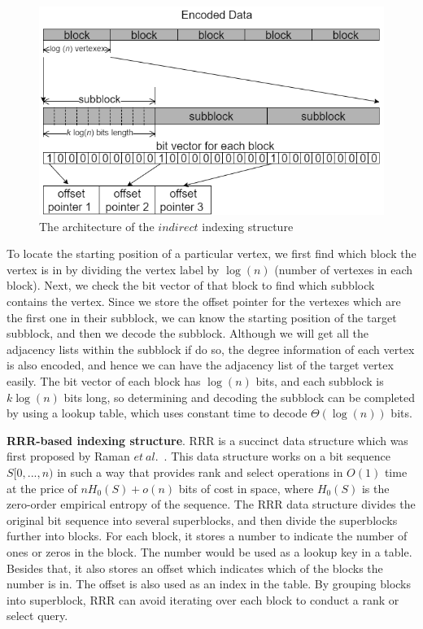 \documentclass[12pt,glossary]{dalthesis}
\begin{document}
\bigskip

\begin{figure}[ht]
\centering
\includegraphics[width=1.0\textwidth]{indirect}
\caption{The architecture of the $indirect$ indexing structure}
\end{figure}

\bigskip

To locate the starting position of a particular vertex, we first find which block the vertex is in by dividing the vertex label by $\log(n)$ (number of vertexes in each block). Next, we check the bit vector of that block to find which subblock contains the vertex. Since we store the offset pointer for the vertexes which are the first one in their subblock, we can know the starting position of the target subblock, and then we decode the subblock. Although we will get all the adjacency lists within the subblock if do so, the degree information of each vertex is also encoded, and hence we can have the adjacency list of the target vertex easily. The bit vector of each block has $\log(n)$ bits, and each subblock is $k\log(n)$ bits long, so determining and decoding the subblock can be completed by using a lookup table, which uses constant time to decode $\Theta(\log(n))$ bits.              

\bigskip
\bigskip

\textbf{RRR-based indexing structure}. RRR is a succinct data structure which was first proposed by Raman $et \ al$.~\cite{RRR}. This data structure works on a bit sequence $S[0,...,n)$ in such a way that provides rank and select operations in $O(1)$ time at the price of $nH_{0}(S)+o(n)$ bits of cost in space, where $H_{0}(S)$ is the zero-order empirical entropy of the sequence. The RRR data structure divides the original bit sequence into several superblocks, and then divide the superblocks further into blocks. For each block, it stores a number to indicate the number of ones or zeros in the block. The number would be used as a lookup key in a table. Besides that, it also stores an offset which indicates which of the blocks the number is in. The offset is also used as an index in the table. By grouping blocks into superblock, RRR can avoid iterating over each block to conduct a rank or select query. 
\end{document}

